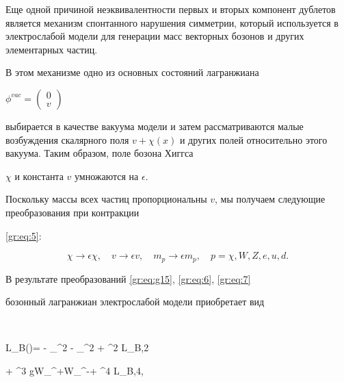 Еще одной причиной неэквивалентности первых и вторых компонент дублетов является механизм спонтанного нарушения симметрии, который используется в электрослабой модели для генерации масс векторных бозонов и других элементарных частиц.

В этом механизме одно из основных состояний лагранжиана

$

  \phi^{vac}=\left(\begin{array}{c}

	0  \\

	v

\end{array} \right) \;

$

выбирается в качестве вакуума модели и затем рассматриваются малые возбуждения скалярного поля $ v+\chi(x) $ и других полей относительно этого вакуума. Таким образом, поле бозона Хиггса 

$ \chi $  и константа $ v $ умножаются на $\epsilon$.

Поскольку массы всех частиц пропорциональны $ v $, мы получаем следующие преобразования при контракции 

\eqref{gr:eq:5}:

\begin{equation}

 	\chi  \rightarrow \epsilon \chi,  \quad  v \rightarrow \epsilon v, \quad %

 m_p \rightarrow \epsilon m_p, \quad p={\chi}, W, Z, e, u, d.

\label{gr:eq:7}

\end{equation}





В результате преобразований \eqref{gr:eq:g15}, \eqref{gr:eq:6}, \eqref{gr:eq:7}

бозонный лагранжиан электрослабой модели приобретает вид 

$$%

 L_B(\epsilon)= - _{\mu\nu}^2 - _{\mu\nu}^2 + \epsilon^2 L_{B,2}

 + \epsilon^3 gW_\mu^{+}W_\mu^{-}\chi  + \epsilon^4 L_{B,4},


